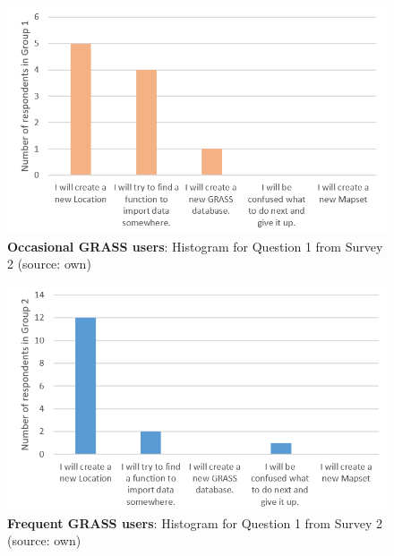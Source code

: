 \documentclass[a4paper,10pt,twoside]{article}
\begin{document}
\vspace{0.3cm}
\begin{figure}[hbt!] 
\begin{center}
\includegraphics[width=14cm]{../surveys/analyzed_data/survey2_question1_histogram_group1.png} 
\caption[\textbf{Occasional GRASS users}: Histogram for Question 1 from Survey 2]{\textbf{Occasional GRASS users}: Histogram for Question 1 from Survey 2 (source: own)}
\label{fig:survey2_question1_histogram_group1}
\end{center}
\end{figure}

\vspace{0.3cm}
\begin{figure}[hbt!] 
\begin{center}
\includegraphics[width=13.5cm]{../surveys/analyzed_data/survey2_question1_histogram_group2.png} 
\caption[\textbf{Frequent GRASS users}: Histogram for Question 1 from Survey 2]{\textbf{Frequent GRASS users}: Histogram for Question 1 from Survey 2 (source: own)}
\label{fig:survey2_question1_histogram_group2}
\end{center}
\end{figure}
\end{document}
